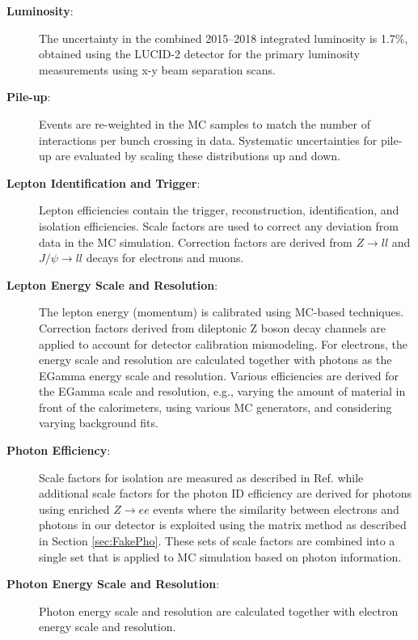 \begin{description}
\item[\textbf{Luminosity}:] The uncertainty in the combined 2015--2018 integrated luminosity is 1.7\%\cite{ATLAS-CONF-2019-021}, obtained using the LUCID-2 detector\cite{LUCID2} for the primary luminosity measurements using x-y beam separation scans.

\item[\textbf{Pile-up}:]  Events are re-weighted in the MC samples to match the number of interactions per bunch crossing in data.  Systematic uncertainties for pile-up are evaluated by scaling these distributions up and down.

\item[\textbf{Lepton Identification and Trigger}:]   Lepton efficiencies contain the trigger, reconstruction, identification, and isolation efficiencies.  Scale factors are used to correct any deviation from data in the MC simulation.  Correction factors are derived from $Z\rightarrow ll$ and $J/ \psi \rightarrow ll$ decays for electrons\cite{ElectronID} and muons\cite{MuonID}.

\item[\textbf{Lepton Energy Scale and Resolution}:]  The lepton energy (momentum) is calibrated using MC-based techniques.  Correction factors derived from dileptonic Z boson decay channels are applied to account for detector calibration mismodeling.  For electrons, the energy scale and resolution are calculated together with photons as the EGamma energy scale and resolution.  Various efficiencies are derived for the EGamma scale and resolution, e.g., varying the amount of material in front of the calorimeters, using various MC generators, and considering varying background fits\cite{ElectronID, PhotonID}.

\item[\textbf{Photon Efficiency}:]  Scale factors for isolation are measured as described in Ref. \cite{Lesage:2017uzg} while additional scale factors for the photon ID efficiency are derived for photons using enriched $Z\rightarrow ee$ events where the similarity between electrons and photons in our detector is exploited using the matrix method as described in Section \ref{sec:FakePho}. These sets of scale factors are combined into a single set that is applied to MC simulation based on photon information.

\item[\textbf{Photon Energy Scale and Resolution}:]  Photon energy scale and resolution are calculated together with electron energy scale and resolution.


\end{description}
